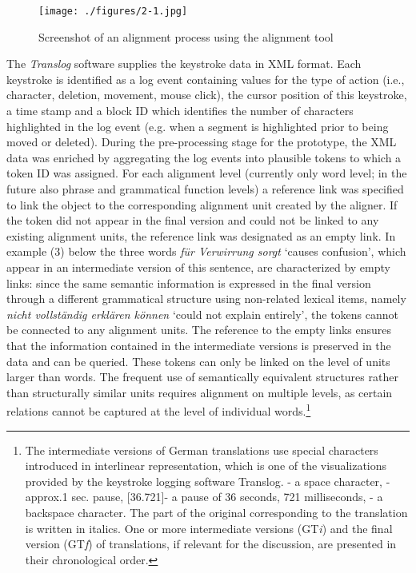 \documentclass[output=paper]{LSP/langsci}
\begin{document}
\begin{figure}
\texttt{[image: ./figures/2-1.jpg]}
\caption{Screenshot of an alignment process using the alignment tool}
\end{figure}


The \textit{Translog} software supplies the keystroke data in XML format. Each keystroke is identified as a log event containing values for the type of action (i.e., character, deletion, movement, mouse click), the cursor position of this keystroke, a time stamp and a block ID which identifies the number of characters highlighted in the log event (e.g. when a segment is highlighted prior to being moved or deleted). During the pre-processing stage for the prototype, the XML data was enriched by aggregating the log events into plausible tokens to which a token ID was assigned. For each alignment level (currently only word level; in the future also phrase and grammatical function levels) a reference link was specified to link the object to the corresponding alignment unit created by the aligner. If the token did not appear in the final version and could not be linked to any existing alignment units, the reference link was designated as an empty link. In example (3) below the three words \textit{für Verwirrung sorgt} ‘causes confusion', which appear in an intermediate version of this sentence, are characterized by empty links: since the same semantic information is expressed in the final version through a different grammatical structure using non-related lexical items, namely \textit{nicht vollständig erklären können} ‘could not explain entirely', the tokens cannot be connected to any alignment units. The reference to the empty links ensures that the information contained in the intermediate versions is preserved in the data and can be queried. These tokens can only be linked on the level of units larger than words. The frequent use of semantically equivalent structures rather than structurally similar units requires alignment on multiple levels, as certain relations cannot be captured at the level of individual words.\footnote{The intermediate versions of German translations use special characters introduced in interlinear representation, which is one of the visualizations provided by the keystroke logging software Translog.  {\raute} - a space character, {\stern} -  approx.1 sec. pause, [{\stern}36.721]- a pause of 36 seconds, 721 milliseconds,{\pfeil} - a backspace character. The part of the original corresponding to the translation is written in italics. One or more intermediate versions (GT\textit{i}) and the final version (GT\textit{f}) of translations, if relevant for the discussion, are presented in their chronological order.}
\end{document}
